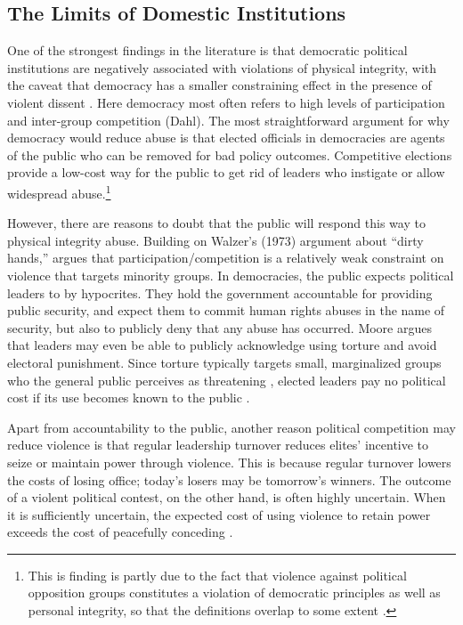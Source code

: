 \documentclass[12pt]{article}
\begin{document}
\subsection*{The Limits of Domestic Institutions}
One of the strongest findings in the literature is that democratic political institutions are negatively associated with violations of physical integrity, with the caveat that democracy has a smaller constraining effect in the presence of violent dissent \citep{Davenport2007AR,Davenport2007}. Here democracy most often refers to high levels of participation and inter-group competition (Dahl). The most straightforward argument for why democracy would reduce abuse is that elected officials in democracies are agents of the public who can be removed for bad policy outcomes. Competitive elections provide a low-cost way for the public to get rid of leaders who instigate or allow widespread abuse.\footnote{This is finding is partly due to the fact that violence against political opposition groups constitutes a violation of democratic principles as well as personal integrity, so that the definitions overlap to some extent \citep{HillJones2014,Hill2016}.}  

However, there are reasons to doubt that the public will respond this way to physical integrity abuse. Building on Walzer's (1973) \nocite{Walzer1973} argument about ``dirty hands,'' \citet{Moore2010} argues that participation/competition is a relatively weak constraint on violence that targets minority groups. In democracies, the public expects political leaders to by hypocrites. They hold the government  accountable for providing public security, and expect them to commit human rights abuses in the name of security, but also to publicly deny that any abuse has occurred. Moore argues that leaders may even be able to publicly acknowledge using torture and avoid electoral punishment. Since torture typically targets small, marginalized groups who the general public perceives as threatening \citep{Rejali2007}, elected leaders pay no political cost if its use becomes known to the public \citep{ConradHillMoore}. 

Apart from accountability to the public, another reason political competition may reduce violence is that regular leadership turnover reduces elites' incentive to seize or maintain power through violence. This is because regular turnover lowers the costs of losing office; today's losers may be tomorrow's winners. The outcome of a violent political contest, on the other hand, is often highly uncertain. When it is sufficiently uncertain, the expected cost of using violence to retain power exceeds the cost of peacefully conceding \citep{Przeworski1991}. 
\end{document}
